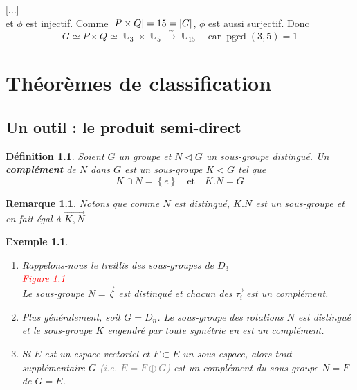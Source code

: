 \documentclass[a4paper, oneside]{report}
\theoremstyle{break}
\newtheorem{definition}[thm]{Définition}
\newtheorem{exemple}[thm]{Exemple}
\newtheorem{remarque}[thm]{Remarque}
\newcommand{\gray}[1]{\textcolor{gray}{#1}}
\newcommand{\red}[1]{\textcolor{red}{#1}}
\DeclareMathOperator{\U}{\mathbb{U}}
\DeclarePairedDelimiter\ens{\left\{ }{\right\} }%
\DeclarePairedDelimiter\abs{\lvert}{\rvert}%
\DeclareMathOperator{\pgcd}{pgcd}
\renewcommand{\ens}[1]{\left\{ #1 \right\} }%
\newcommand{\slign}{\textbf}
\newcommand{\os}{\overset}
\begin{document}
[...]\\
et $\phi$ est injectif. Comme $\abs{P \times Q} = 15 = \abs{G}$, $\phi$ est aussi surjectif. Donc
\[
G \simeq P \times Q \simeq \U_3 \times \U_5 \os{\sim}{\rightarrow} \U_{15}	\quad	\text{car} \; \pgcd(3, 5) = 1
\]

\chapter{Théorèmes de classification}

\section{Un outil : le produit semi-direct}

\begin{definition}
Soient $G$ un groupe et $N \triangleleft G$ un sous-groupe distingué. Un \slign{complément} de $N$ dans $G$ est un sous-groupe $K < G$ tel que
\[
K \cap N = \ens{e}		\quad	\text{et}	\quad	K.N = G
\]
\end{definition}

\begin{remarque}
Notons que comme $N$ est distingué, $K.N$ est un sous-groupe et en fait égal à $\vec{K, N}$
\end{remarque}

\begin{exemple}
\begin{enumerate}
\item Rappelons-nous le treillis des sous-groupes de $D_3$\\

\red{Figure 1.1}\\

Le sous-groupe $N = \vec{\zeta}$ est distingué et chacun des $\vec{\tau_i}$ est un complément.

\medbreak

\item Plus généralement, soit $G = D_n$. Le sous-groupe des rotations $N$ est distingué et le sous-groupe $K$ engendré par toute symétrie en est un complément.

\medbreak

\item  Si $E$ est un espace vectoriel et $F \subset E$ un sous-espace, alors tout supplémentaire $G$ \gray{(i.e. $E = F \oplus G$)} est un complément du sous-groupe $N = F$ de $G = E$.

\end{enumerate}
\end{exemple}
\end{document}
